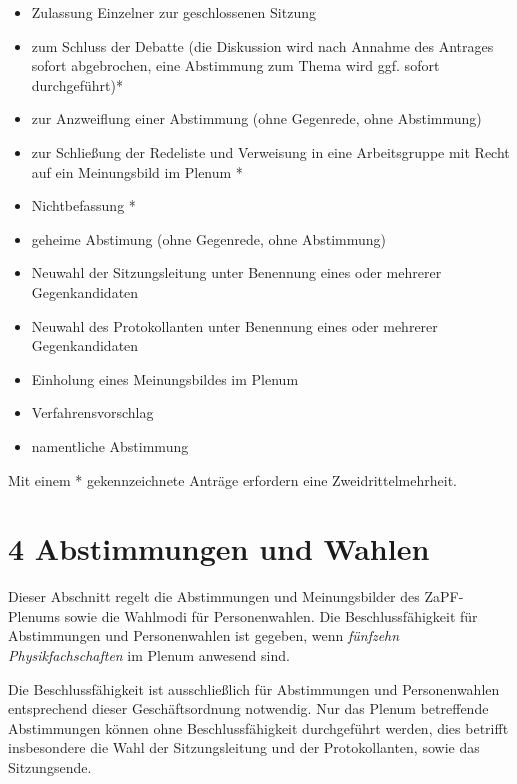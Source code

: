 \documentclass[12pt,oneside]{scrartcl}
\begin{document}
\begin{list}{.}
\begin{itemize}
\item Zulassung Einzelner zur geschlossenen Sitzung

\item zum Schluss der Debatte (die Diskussion wird nach Annahme des
Antrages sofort abgebrochen, eine Abstimmung zum Thema wird ggf.
sofort durchgeführt)*

\item zur Anzweiflung einer Abstimmung (ohne Gegenrede, ohne Abstimmung)

\item zur Schließung der Redeliste und Verweisung in eine Arbeitsgruppe mit
Recht auf ein Meinungsbild im Plenum *

\item Nichtbefassung *

\item geheime Abstimung (ohne Gegenrede, ohne Abstimmung)

\item Neuwahl der Sitzungsleitung unter Benennung eines oder mehrerer Gegenkandidaten

\item Neuwahl des Protokollanten unter Benennung eines oder mehrerer Gegenkandidaten

\item Einholung eines Meinungsbildes im Plenum

\item Verfahrensvorschlag

\item namentliche Abstimmung

\end{itemize}

Mit einem * gekennzeichnete Anträge erfordern eine Zweidrittelmehrheit.
\end{list}


\section{4 Abstimmungen und Wahlen%
  \label{abstimmungen-und-wahlen}%
}

Dieser Abschnitt regelt die Abstimmungen und Meinungsbilder des ZaPF-Plenums
sowie die Wahlmodi für Personenwahlen. Die Beschlussfähigkeit für Abstimmungen
und Personenwahlen ist gegeben, wenn \emph{fünfzehn Physikfachschaften}
im Plenum anwesend sind.

Die Beschlussfähigkeit ist ausschließlich für Abstimmungen und Personenwahlen
entsprechend dieser Geschäftsordnung notwendig.
Nur das Plenum betreffende Abstimmungen können ohne Beschlussfähigkeit
durchgeführt werden, dies betrifft insbesondere die Wahl der Sitzungsleitung und der
Protokollanten, sowie das Sitzungsende.
\end{document}
